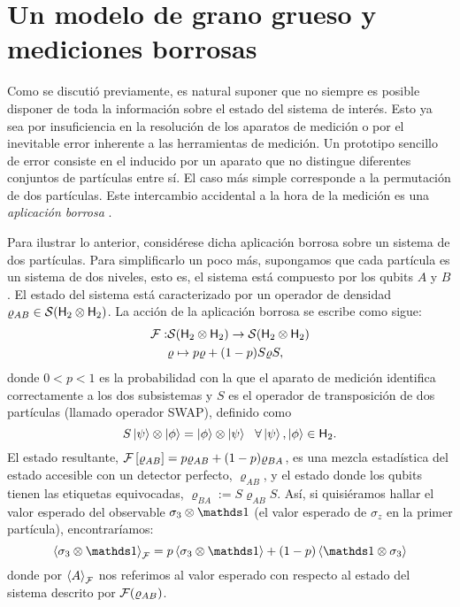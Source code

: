 \section{Un modelo de grano grueso y mediciones borrosas}
\label{sec:ch3_cg}


Como se discutió previamente, es natural suponer que no siempre es posible disponer de toda la información sobre el estado
 del sistema de interés. Esto ya sea por insuficiencia en la resolución de los aparatos de medición o por el inevitable error inherente a las herramientas de medición. Un prototipo sencillo de error consiste en el inducido por un aparato que no distingue diferentes conjuntos de partículas entre sí. El caso más simple corresponde a la permutación de dos partículas. Este intercambio accidental a la hora de la medición es una \textit{aplicación borrosa} \cite{FuzzyMeasurements}.

Para ilustrar lo anterior, considérese dicha aplicación borrosa sobre un sistema de dos partículas. Para simplificarlo un poco más, supongamos que cada partícula es un sistema de dos niveles, esto es, el sistema está compuesto por los qubits $A$ y $B$. El estado del sistema está caracterizado por un operador de densidad $\varrho_{AB} \in \mathcal{S}({\sf H}_2 \otimes {\sf H}_2)$. La acción de la aplicación borrosa se escribe como sigue:
\begin{align}
\mathcal{F}:&\mathcal{S}({\sf H}_2 \otimes {\sf H}_2)\to \mathcal{S}({\sf H}_2 \otimes {\sf H}_2)\nonumber\\
&\varrho \mapsto p\varrho+(1-p)S\varrho S,\nonumber
\end{align}
donde $0<p<1$ es la probabilidad con la que el aparato de medición identifica correctamente  a los dos subsistemas y $S$ es el operador de transposición de dos partículas (llamado operador SWAP), definido como 
\begin{equation}
    S\ket{\psi}\otimes \ket{\phi}=\ket{\phi}\otimes \ket{\psi} \ \ \forall \ket{\psi},\ket{\phi}\in {\sf H}_2.\nonumber
\end{equation}
El estado resultante, $\mathcal{F}\left[\varrho_{AB}\right]=p\varrho_{AB}+(1-p)\varrho_{BA}$, es una mezcla estadística del estado accesible con un detector perfecto, $\varrho_{AB}$, y el estado donde los qubits tienen las etiquetas equivocadas, $\varrho_{BA}:=S\varrho_{AB} S$. Así, si quisiéramos hallar el valor esperado del observable $\sigma_{3}\otimes\Id$ (el valor esperado de $\sigma_{z}$ en la primer partícula), encontraríamos:
\begin{equation}
    \expval{\sigma_{3}\otimes\Id}_{\mcF}=p\expval{\sigma_{3}\otimes\Id}+(1-p)\expval{\Id\otimes\sigma_{3}}\nonumber
\end{equation}
donde por $\expval{A}_{\mathcal{F}}$ nos referimos al valor esperado con respecto al estado del sistema descrito por $\mathcal{F}(\varrho_{AB})$.

